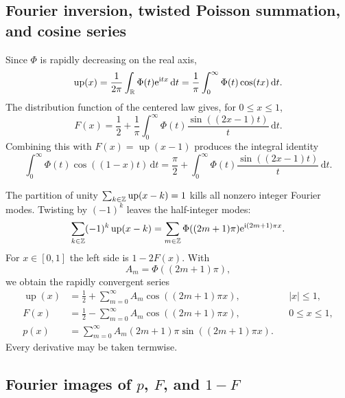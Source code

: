 \documentclass[11pt]{article}
\theoremstyle{definition}
\theoremstyle{remark}
\newcommand{\R}{\mathbb R}
\newcommand{\dd}{\,\mathrm d}
\newcommand{\Up}{\operatorname{up}}
\begin{document}
\subsection{Fourier inversion, twisted Poisson summation, and cosine series}

Since $\Phi$ is rapidly decreasing on the real axis,
\begin{equation}\label{p3:eq:up-Fourier-inversion}
 \Up(x)=\frac1{2\pi}\int_\R\Phi(t)\e^{\ii tx}\dd t
 =\frac1\pi\int_0^\infty\Phi(t)\cos(tx)\dd t.
\end{equation}
The distribution function of the centered law gives, for $0\le x\le1$,
\begin{equation}\label{p3:eq:F-GilPelaez}
 F(x)=\frac12+\frac1\pi\int_0^\infty
 \Phi(t)\frac{\sin((2x-1)t)}{t}\dd t.
\end{equation}
Combining this with $F(x)=\Up(x-1)$ produces the integral identity
\begin{equation}\label{p3:eq:sine-cosine-duality}
 \int_0^\infty\Phi(t)\cos((1-x)t)\dd t
 =\frac\pi2+\int_0^\infty\Phi(t)
   \frac{\sin((2x-1)t)}{t}\dd t.
\end{equation}

The partition of unity $\sum_{k\in\Z}\Up(x-k)=1$ kills all nonzero integer
Fourier modes.  Twisting by $(-1)^k$ leaves the half-integer modes:
\begin{equation}\label{p3:eq:twisted-Poisson}
 \sum_{k\in\Z}(-1)^k\Up(x-k)
 =\sum_{m\in\Z}\Phi((2m+1)\pi)\e^{\ii(2m+1)\pi x}.
\end{equation}
For $x\in[0,1]$ the left side is $1-2F(x)$.  With
\begin{equation}\label{p3:eq:A_m}
 A_m=\Phi((2m+1)\pi),
\end{equation}
we obtain the rapidly convergent series
\begin{align}
 \Up(x)&=\frac12+\sum_{m=0}^\infty A_m
          \cos((2m+1)\pi x), &&|x|\le1,\label{p3:eq:up-half-series}\\
 F(x)&=\frac12-\sum_{m=0}^\infty A_m
          \cos((2m+1)\pi x), &&0\le x\le1,\label{p3:eq:F-half-series}\\
 p(x)&=\sum_{m=0}^\infty A_m(2m+1)\pi
          \sin((2m+1)\pi x).\label{p3:eq:p-half-series}
\end{align}
Every derivative may be taken termwise.

\subsection{Fourier images of $p$, $F$, and $1-F$}
\end{document}
